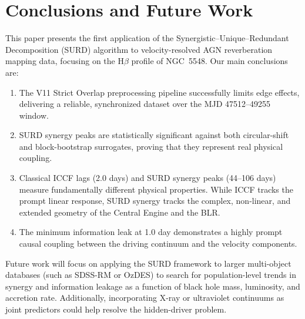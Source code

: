 \documentclass[12pt, a4paper]{article}
\begin{document}
\section{Conclusions and Future Work}
\label{sec:conclusion}

This paper presents the first application of the Synergistic–Unique–Redundant Decomposition (SURD) algorithm to velocity-resolved AGN reverberation mapping data, focusing on the H\(\beta\) profile of NGC~5548. Our main conclusions are:
\begin{enumerate}
    \item The V11 Strict Overlap preprocessing pipeline successfully limits edge effects, delivering a reliable, synchronized dataset over the MJD 47512--49255 window.
    \item SURD synergy peaks are statistically significant against both circular-shift and block-bootstrap surrogates, proving that they represent real physical coupling.
    \item Classical ICCF lags (2.0 days) and SURD synergy peaks (44--106 days) measure fundamentally different physical properties. While ICCF tracks the prompt linear response, SURD synergy tracks the complex, non-linear, and extended geometry of the Central Engine and the BLR.
    \item The minimum information leak at 1.0 day demonstrates a highly prompt causal coupling between the driving continuum and the velocity components.
\end{enumerate}

Future work will focus on applying the SURD framework to larger multi-object databases (such as SDSS-RM or OzDES) to search for population-level trends in synergy and information leakage as a function of black hole mass, luminosity, and accretion rate. Additionally, incorporating X-ray or ultraviolet continuums as joint predictors could help resolve the hidden-driver problem.

\printbibliography


%
%
\end{document}
